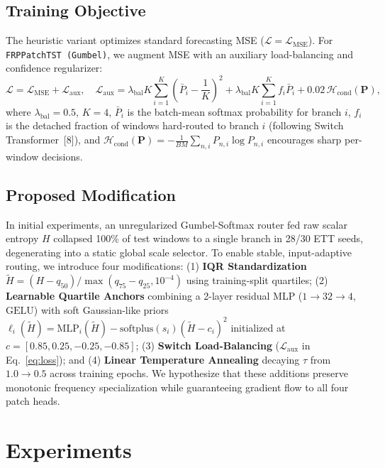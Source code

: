 \documentclass[11pt, letterpaper]{article}
\begin{document}
\subsection{Training Objective}
The heuristic variant optimizes standard forecasting MSE ($\mathcal{L} = \mathcal{L}_{\mathrm{MSE}}$). For \texttt{FRPPatchTST (Gumbel)}, we augment MSE with an auxiliary load-balancing and confidence regularizer:
\begin{equation}
  \mathcal{L} = \mathcal{L}_{\mathrm{MSE}} + \mathcal{L}_{\mathrm{aux}}, \quad
  \mathcal{L}_{\mathrm{aux}} = \lambda_{\mathrm{bal}} K \sum_{i=1}^{K} \left(\bar{P}_i - \frac{1}{K}\right)^2 + \lambda_{\mathrm{bal}} K \sum_{i=1}^{K} f_i \bar{P}_i + 0.02\,\mathcal{H}_{\mathrm{cond}}(\mathbf{P}),
  \label{eq:loss}
\end{equation}
where $\lambda_{\mathrm{bal}}=0.5$, $K=4$, $\bar{P}_i$ is the batch-mean softmax probability for branch $i$, $f_i$ is the detached fraction of windows hard-routed to branch $i$ (following Switch Transformer~[8]), and $\mathcal{H}_{\mathrm{cond}}(\mathbf{P}) = -\frac{1}{BM}\sum_{n,i} P_{n,i}\log P_{n,i}$ encourages sharp per-window decisions.

\subsection{Proposed Modification}
In initial experiments, an unregularized Gumbel-Softmax router fed raw scalar entropy $H$ collapsed 100\% of test windows to a single branch in 28/30 ETT seeds, degenerating into a static global scale selector. To enable stable, input-adaptive routing, we introduce four modifications: (1) \textbf{IQR Standardization} $\tilde{H} = (H - q_{50}) / \max(q_{75} - q_{25}, 10^{-4})$ using training-split quartiles; (2) \textbf{Learnable Quartile Anchors} combining a 2-layer residual MLP ($1 \to 32 \to 4$, $\mathrm{GELU}$) with soft Gaussian-like priors $\ell_i(\tilde{H}) = \mathrm{MLP}_i(\tilde{H}) - \mathrm{softplus}(s_i)(\tilde{H} - c_i)^2$ initialized at $c = [0.85, 0.25, -0.25, -0.85]$; (3) \textbf{Switch Load-Balancing} ($\mathcal{L}_{\mathrm{aux}}$ in Eq.~\eqref{eq:loss}); and (4) \textbf{Linear Temperature Annealing} decaying $\tau$ from $1.0 \to 0.5$ across training epochs. We hypothesize that these additions preserve monotonic frequency specialization while guaranteeing gradient flow to all four patch heads.

\section{Experiments}
\end{document}

